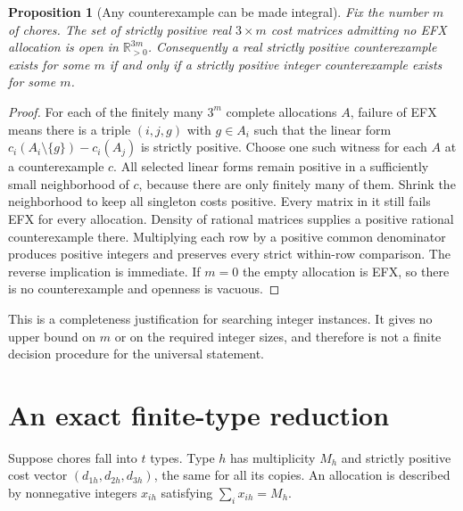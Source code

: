 \documentclass[11pt]{article}
\newtheorem{proposition}[theorem]{Proposition}
\theoremstyle{definition}
\newcommand{\R}{\mathbb R}
\begin{document}
\begin{proposition}[Any counterexample can be made integral]
Fix the number $m$ of chores. The set of strictly positive real $3\times m$
cost matrices admitting no EFX allocation is open in $\R_{>0}^{3m}$.
Consequently a real strictly positive counterexample exists for some $m$ if
and only if a strictly positive integer counterexample exists for some $m$.
\end{proposition}
\begin{proof}
For each of the finitely many $3^m$ complete allocations $A$, failure of EFX
means there is a triple $(i,j,g)$ with $g\in A_i$ such that the linear form
$c_i(A_i\setminus\{g\})-c_i(A_j)$ is strictly positive.
Choose one such witness for each $A$ at a counterexample $c$. All selected
linear forms remain positive in a sufficiently small neighborhood of $c$,
because there are only finitely many of them. Shrink the neighborhood to keep
all singleton costs positive. Every matrix in it still fails EFX for every
allocation. Density of rational matrices supplies a positive rational
counterexample there. Multiplying each row by a positive common denominator
produces positive integers and preserves every strict within-row comparison.
The reverse implication is immediate. If $m=0$ the empty allocation is EFX,
so there is no counterexample and openness is vacuous.
\end{proof}

This is a completeness justification for searching integer instances. It gives
no upper bound on $m$ or on the required integer sizes, and therefore is not
a finite decision procedure for the universal statement.

\section{An exact finite-type reduction}
Suppose chores fall into $t$ types. Type $h$ has multiplicity $M_h$ and strictly
positive cost vector $(d_{1h},d_{2h},d_{3h})$, the same for all its copies.
An allocation is described by nonnegative integers $x_{ih}$ satisfying
$\sum_i x_{ih}=M_h$.
\end{document}

